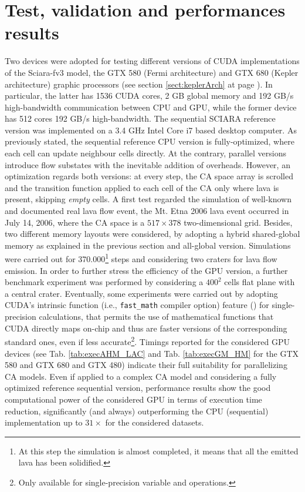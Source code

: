 \section{Test, validation and performances results}

  Two devices were adopted for testing
different versions of CUDA implementations of the Sciara-fv3 model, the GTX 580 (Fermi architecture) and GTX 680 (Kepler
architecture) graphic processors (see section \ref{sect:keplerArch} at page
\pageref{sect:keplerArch}). In particular, the latter has 1536 CUDA cores, 2 GB
global memory and 192 GB/s high-bandwidth communication between CPU and GPU,
while the former device has 512 cores 192 GB/s high-bandwidth. The sequential
SCIARA reference version was implemented on a 3.4 GHz Intel Core i7 based
desktop computer. As previously stated, the sequential reference CPU version is
fully-optimized, where each cell can update neighbour cells directly.
At the contrary, parallel versions introduce flow substates with the inevitable
addition of overheads. However, an optimization regards both versions: at every
step, the CA space array is scrolled and the transition function applied to each
cell of the CA only where lava is present, skipping \textsl{empty} cells.
A first test regarded the simulation of well-known and documented real lava flow
event, the Mt. Etna 2006 lava event occurred in July 14, 2006, where the CA
space is a $517 \times 378$ two-dimensional grid. Besides, two different memory
layouts were considered, by adopting a hybrid shared-global memory as explained
in the previous section and all-global version.
Simulations were carried out for 370.000\footnote{At this step the simulation is
almost completed, it means that all the emitted lava has been solidified.} steps
and considering two craters for lava flow emission.
In order to further stress the efficiency of the GPU version, a further
benchmark experiment was performed by considering a $400^2$ cells flat plane
with a central crater. Eventually, some experiments were carried out by adopting
CUDA's intrinsic function (i.e., \texttt{fast\_math} compiler option) feature
(\cite{NvidiaprogGuide}) for single-precision calculations, that permits the use
of mathematical functions that CUDA directly maps on-chip and thus are faster
versions of the corresponding standard ones, even if less
accurate\footnote{Only available for single-precision variable and operations.}.
Timings reported for the considered GPU devices (see Tab.
\ref{tab:execAHM_LAC} and Tab. \ref{tab:execGM_HM} for the GTX 580 and
GTX 680 and GTX 480) indicate their full suitability for parallelizing CA
models. Even if applied to a complex CA model and considering a fully optimized
reference sequential version, performance results show the good computational
power of the considered GPU in terms of execution time reduction, significantly
(and always) outperforming the CPU (sequential) implementation up to $31\times$
for the considered datasets.


